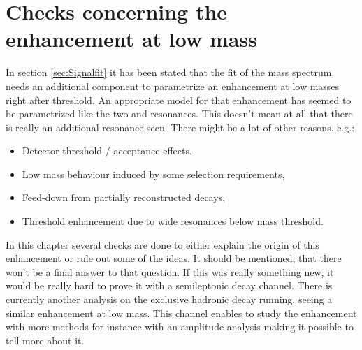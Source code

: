 \chapter{Checks concerning the enhancement at low \Dz\proton mass}
\label{sec:Structure}

In section \ref{sec:Signalfit} it has been stated that the fit of the \Dz\proton mass spectrum needs an additional component to parametrize an enhancement at low \Dz\proton masses right after threshold.
An appropriate model for that enhancement has seemed to be parametrized like the two \LcResI and \LcResII resonances.
This doesn't mean at all that there is really an additional resonance seen.
There might be a lot of other reasons, e.g.:
\begin{itemize}
    \item Detector threshold / acceptance effects,
    \item Low mass behaviour induced by some selection requirements,
    \item Feed-down from partially reconstructed decays,
    \item Threshold enhancement due to wide resonances below \Dz\proton mass threshold.
\end{itemize}
In this chapter several checks are done to either explain the origin of this enhancement or rule out some of the ideas.
It should be mentioned, that there won't be a final answer to that question.
If this was really something new, it would be really hard to prove it with a semileptonic decay channel.
There is currently another \lhcb analysis on the exclusive hadronic decay \decay{\Lb}{\Dz\proton\pim} running, seeing a similar enhancement at low \Dz\proton mass.
This channel enables to study the enhancement with more methods for instance with an amplitude analysis making it possible to tell more about it.

